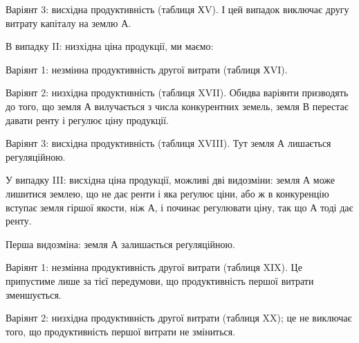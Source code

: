 Варіянт 3: висхідна продуктивність (таблиця ХV). І цей випадок виключає
другу витрату капіталу на землю $А$.

В випадку II: низхідна ціна продукції, ми маємо:

Варіянт 1: незмінна продуктивність другої витрати (таблиця ХVI).

Варіянт 2: низхідна продуктивність (таблиця XVII). Обидва варіянти призводять
до того, що земля $А$ вилучається з числа конкурентних земель, земля
$В$ перестає давати ренту і регулює ціну продукції.

Варіянт 3: висхідна продуктивність (таблиця XVIII). Тут земля $А$ лишається
регуляційною.

У випадку III: висхідна ціна продукції, можливі дві видозміни: земля
$А$ може лишитися землею, що не дає ренти і яка реґулює ціни, або ж в конкуренцію
вступає земля гіршої якости, ніж $А$, і починає регулювати ціну, так що $А$
тоді дає ренту.

Перша видозміна: земля $А$ залишається реґуляційною.

Варіянт 1: незмінна продуктивність другої витрати (таблиця XIX). Це припустиме
лише за тієї передумови, що продуктивність першої витрати
зменшується.

Варіянт 2: низхідна продуктивність другої витрати (таблиця XX); це не виключає
того, що продуктивність першої витрати не зміниться.
